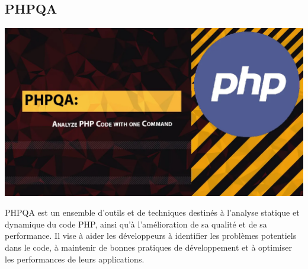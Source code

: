 		\subsection{PHPQA}
			\begin{center}
				\includegraphics[scale=0.3]{chap_3/phpqa.png}
				\label{PHPQA}
				\cite{phpqa_image}
			\end{center}
		
		PHPQA est un ensemble d'outils et de techniques destinés à l'analyse statique et dynamique du code PHP, ainsi qu'à l'amélioration de sa qualité et de sa performance. Il vise à aider les développeurs à identifier les problèmes potentiels dans le code, à maintenir de bonnes pratiques de développement et à optimiser les performances de leurs applications.
		
